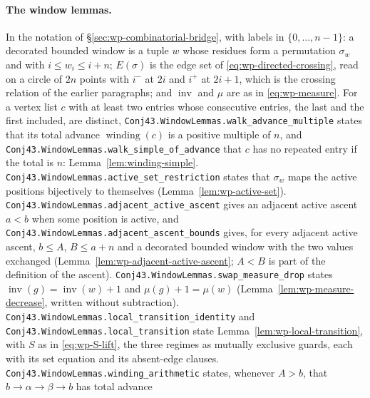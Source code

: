 \documentclass[11pt]{article}
\theoremstyle{definition}
\begin{document}
\paragraph{The window lemmas.}
In the notation of \S\ref{sec:wp-combinatorial-bridge}, with labels in $\{0,\ldots,n-1\}$: a decorated bounded window
is a tuple $w$ whose residues form a permutation $\sigma_w$ and with $i\le w_i\le i+n$; $E(\sigma)$ is the edge set of
\eqref{eq:wp-directed-crossing}, read on a circle of $2n$ points with $i^-$ at $2i$ and $i^+$ at $2i+1$, which is the
crossing relation of the earlier paragraphs; and $\operatorname{inv}$ and $\mu$ are as in \eqref{eq:wp-measure}. For a
vertex list $c$ with at least two entries whose consecutive entries, the last and the first included, are distinct,
\texttt{Conj43.\allowbreak WindowLemmas.\allowbreak walk\_\allowbreak advance\_\allowbreak multiple} states that its total advance $\operatorname{winding}(c)$ is a positive multiple of $n$,
and \texttt{Conj43.\allowbreak WindowLemmas.\allowbreak walk\_\allowbreak simple\_\allowbreak of\_\allowbreak advance} that $c$ has no repeated entry if the total is $n$: Lemma~\ref{lem:winding-simple}.
\texttt{Conj43.\allowbreak WindowLemmas.\allowbreak active\_\allowbreak set\_\allowbreak restriction} states that $\sigma_w$ maps the active positions bijectively to themselves
(Lemma~\ref{lem:wp-active-set}). \texttt{Conj43.\allowbreak WindowLemmas.\allowbreak adjacent\_\allowbreak active\_\allowbreak ascent} gives an adjacent active ascent $a<b$ when some position
is active, and \texttt{Conj43.\allowbreak WindowLemmas.\allowbreak adjacent\_\allowbreak ascent\_\allowbreak bounds} gives, for every adjacent active ascent, $b\le A$, $B\le a+n$ and a
decorated bounded window with the two values exchanged (Lemma~\ref{lem:wp-adjacent-active-ascent}; $A<B$ is part of
the definition of the ascent). \texttt{Conj43.\allowbreak WindowLemmas.\allowbreak swap\_\allowbreak measure\_\allowbreak drop} states $\operatorname{inv}(g)=\operatorname{inv}(w)+1$ and
$\mu(g)+1=\mu(w)$ (Lemma~\ref{lem:wp-measure-decrease}, written without subtraction).
\texttt{Conj43.\allowbreak WindowLemmas.\allowbreak local\_\allowbreak transition\_\allowbreak identity} and \texttt{Conj43.\allowbreak WindowLemmas.\allowbreak local\_\allowbreak transition} state Lemma~\ref{lem:wp-local-transition}, with $S$ as in
\eqref{eq:wp-S-lift}, the three regimes as mutually exclusive guards, each with its set equation and its
absent-edge clauses. \texttt{Conj43.\allowbreak WindowLemmas.\allowbreak winding\_\allowbreak arithmetic} states, whenever $A>b$, that $b\to\alpha\to\beta\to b$ has total advance
\end{document}
